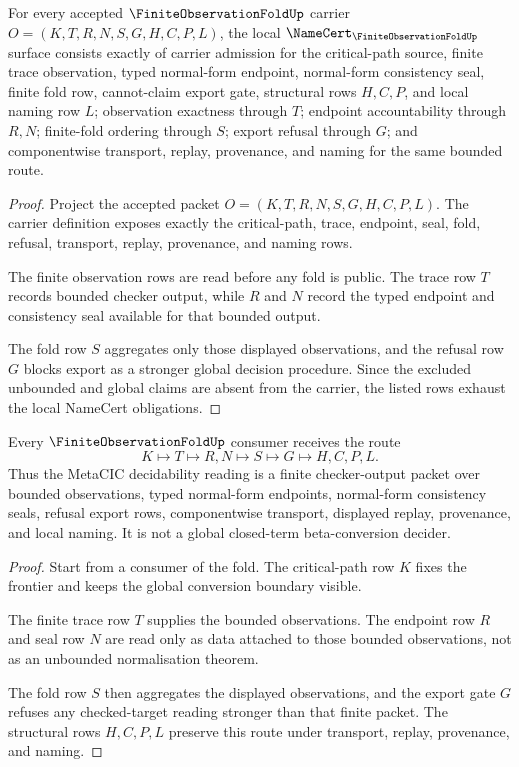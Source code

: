 \begin{theorem}
\label{thm:finite-observation-fold-namecert-obligations}
For every accepted $\FiniteObservationFoldUp$ carrier $O=(K,T,R,N,S,G,H,C,P,L)$, the local $\NameCert_{\FiniteObservationFoldUp}$ surface consists exactly of carrier admission for the critical-path source, finite trace observation, typed normal-form endpoint, normal-form consistency seal, finite fold row, cannot-claim export gate, structural rows $H,C,P$, and local naming row $L$; observation exactness through $T$; endpoint accountability through $R,N$; finite-fold ordering through $S$; export refusal through $G$; and componentwise transport, replay, provenance, and naming for the same bounded route.
\end{theorem}
\begin{proof}
Project the accepted packet $O=(K,T,R,N,S,G,H,C,P,L)$. The carrier definition exposes exactly the critical-path, trace, endpoint, seal, fold, refusal, transport, replay, provenance, and naming rows.

The finite observation rows are read before any fold is public. The trace row $T$ records bounded checker output, while $R$ and $N$ record the typed endpoint and consistency seal available for that bounded output.

The fold row $S$ aggregates only those displayed observations, and the refusal row $G$ blocks export as a stronger global decision procedure. Since the excluded unbounded and global claims are absent from the carrier, the listed rows exhaust the local NameCert obligations.
\end{proof}

\begin{theorem}
\label{thm:finite-observation-fold-vision-handoff}
Every $\FiniteObservationFoldUp$ consumer receives the route
$$
K \longmapsto T \longmapsto R,N \longmapsto S \longmapsto G \longmapsto H,C,P,L .
$$
Thus the MetaCIC decidability reading is a finite checker-output packet over bounded observations, typed normal-form endpoints, normal-form consistency seals, refusal export rows, componentwise transport, displayed replay, provenance, and local naming. It is not a global closed-term beta-conversion decider.
\end{theorem}
\begin{proof}
Start from a consumer of the fold. The critical-path row $K$ fixes the frontier and keeps the global conversion boundary visible.

The finite trace row $T$ supplies the bounded observations. The endpoint row $R$ and seal row $N$ are read only as data attached to those bounded observations, not as an unbounded normalisation theorem.

The fold row $S$ then aggregates the displayed observations, and the export gate $G$ refuses any checked-target reading stronger than that finite packet. The structural rows $H,C,P,L$ preserve this route under transport, replay, provenance, and naming.
\end{proof}

